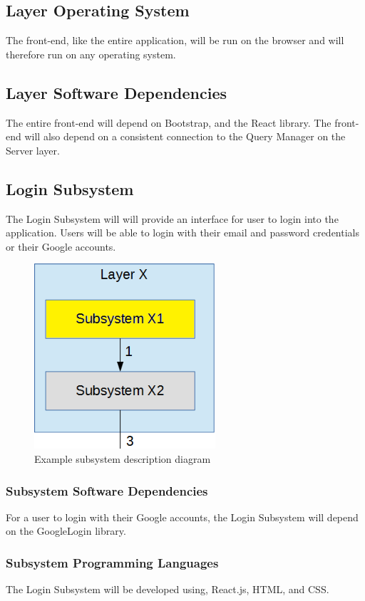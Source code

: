 \subsection{Layer Operating System}
The front-end, like the entire application, will be run on the browser and will therefore run on any operating system.

\subsection{Layer Software Dependencies}
The entire front-end will depend on Bootstrap, and the React library. The front-end will also depend on a consistent connection to the Query Manager on the Server layer.

\subsection{Login Subsystem}
The Login Subsystem will will provide an interface for user to login into the application. Users will be able to login with their email and password credentials or their Google accounts.

\begin{figure}[h!]
	\centering
 	\includegraphics[width=0.60\textwidth]{images/subsystem}
 \caption{Example subsystem description diagram}
\end{figure}

\subsubsection{Subsystem Software Dependencies}
For a user to login with their Google accounts, the Login Subsystem will depend on the GoogleLogin library.

\subsubsection{Subsystem Programming Languages}
The Login Subsystem will be developed using, React.js, HTML, and CSS.

